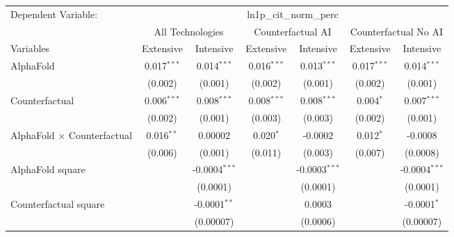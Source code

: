 \begingroup
\centering
\begin{tabular}{lcccccc}
   \tabularnewline \midrule \midrule
   Dependent Variable: & \multicolumn{6}{c}{ln1p\_cit\_norm\_perc}\\
 & \multicolumn{2}{c}{All Technologies} & \multicolumn{2}{c}{Counterfactual AI} & \multicolumn{2}{c}{Counterfactual No AI} \\
\cmidrule(lr){1-1}\cmidrule(lr){2-3} \cmidrule(lr){4-5} \cmidrule(lr){6-7}
Variables & \multicolumn{1}{c}{Extensive} & \multicolumn{1}{c}{Intensive} & \multicolumn{1}{c}{Extensive} & \multicolumn{1}{c}{Intensive} & \multicolumn{1}{c}{Extensive} & \multicolumn{1}{c}{Intensive} \\
\cmidrule(lr){1-1}\cmidrule(lr){2-2} \cmidrule(lr){3-3} \cmidrule(lr){4-4} \cmidrule(lr){5-5} \cmidrule(lr){6-6} \cmidrule(lr){7-7}
   AlphaFold                          & 0.017$^{***}$ & 0.014$^{***}$   & 0.016$^{***}$ & 0.013$^{***}$   & 0.017$^{***}$ & 0.014$^{***}$\\   
                                      & (0.002)       & (0.001)         & (0.002)       & (0.001)         & (0.002)       & (0.001)\\   
   Counterfactual                     & 0.006$^{***}$ & 0.008$^{***}$   & 0.008$^{***}$ & 0.008$^{***}$   & 0.004$^{*}$   & 0.007$^{***}$\\   
                                      & (0.002)       & (0.001)         & (0.003)       & (0.003)         & (0.002)       & (0.001)\\   
   AlphaFold $\times$ Counterfactual  & 0.016$^{**}$  & 0.00002         & 0.020$^{*}$   & -0.0002         & 0.012$^{*}$   & -0.0008\\   
                                      & (0.006)       & (0.001)         & (0.011)       & (0.003)         & (0.007)       & (0.0008)\\   
   AlphaFold square                   &               & -0.0004$^{***}$ &               & -0.0003$^{***}$ &               & -0.0004$^{***}$\\   
                                      &               & (0.0001)        &               & (0.0001)        &               & (0.0001)\\   
   Counterfactual square              &               & -0.0001$^{**}$  &               & 0.0003          &               & -0.0001$^{*}$\\   
                                      &               & (0.00007)       &               & (0.0006)        &               & (0.00007)\\   

\end{tabular}
